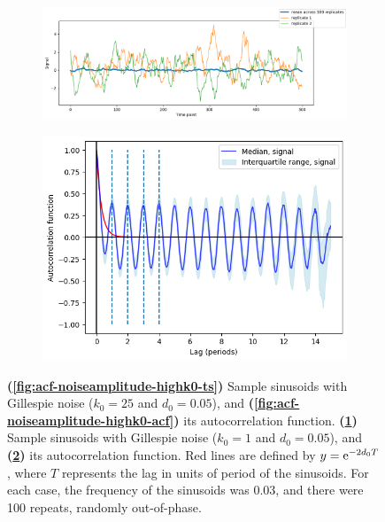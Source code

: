 \begin{figure}
  \begin{subfigure}[t]{0.6\textwidth}
  \centering
    \includegraphics[width=\linewidth]{gillespie_k1_d0p05_mean.png}
    \caption{
    }
    \label{fig:acf-noiseamplitude-lowk0-ts}
  \end{subfigure}%
  \begin{subfigure}[t]{0.4\textwidth}
  \centering
    \includegraphics[width=\linewidth]{gillespie_k1_d0p05_acf.png}
    \caption{
    }
    \label{fig:acf-noiseamplitude-lowk0-acf}
  \end{subfigure}

  \caption[
    Effect of birth rate of Gillespie noise on the autocorrelation function.
  ]{
    \textbf{(\ref{fig:acf-noiseamplitude-highk0-ts})} Sample sinusoids with Gillespie noise ($k_{0} = 25$ and $d_{0} = 0.05$), and 
    \textbf{(\ref{fig:acf-noiseamplitude-highk0-acf})} its autocorrelation function.
    \textbf{(\ref{fig:acf-noiseamplitude-lowk0-ts})} Sample sinusoids with Gillespie noise ($k_{0} = 1$ and $d_{0} = 0.05$), and 
    \textbf{(\ref{fig:acf-noiseamplitude-lowk0-acf})} its autocorrelation function.
    Red lines are defined by $y = \mathrm{e}^{-2d_{0}T}$, where $T$ represents the lag in units of period of the sinusoids.
    For each case, the frequency of the sinusoids was 0.03, and there were 100 repeats, randomly out-of-phase.
  }
  \label{fig:acf-noiseamplitude}
\end{figure}


